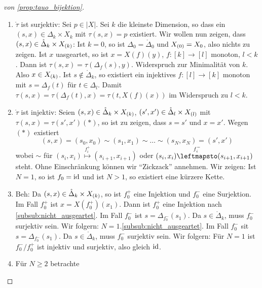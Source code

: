 \begin{proof}[von \cref{prop:tauo_bijektion}]
  \begin{enumerate}
    \item $\mathring\tau$ ist surjektiv: Sei $p\in |X|$. Sei
      $k$ die kleinste Dimension, so dass ein $(s,x) \in\Delta_k\times X_k$ mit
      $\tau(s,x) = p$ existiert. Wir wollen nun zeigen, dass
      $(s,x) \in \mathring\Delta_k \times X_{(k)}$: Ist $k=0$, so ist 
      $\Delta_0 = \mathring\Delta_0$ und $X_{(0)} = X_0$, also nichts zu
      zeigen. Ist $x$ uasgeartet, so ist $x = X(f)(y)$, $f:[k]\to[l]$ monoton,
      $l < k$. Dann ist $\tau(s,x) = \tau(\Delta_f(s),y)$. Widerspruch zur
      Minimalität von $k$. Also $x \in X_{(k)}$. Ist
      $s\notin\mathring\Delta_k$, so existiert ein injektives $f:[l]\to[k]$
      monoton mit $s = \Delta_f(t)$ für $t\in \Delta_l$. Damit 
      $\tau(s,x) = \tau(\Delta_f(t),x) = \tau(t,X(f)(x))$ im Widerspruch zu 
      $l<k$.
    \item $\mathring\tau$ ist injektiv: Seien 
      $(s,x) \in \mathring\Delta_k \times X_{(k)}$,
      $(s',x')\in\mathring\Delta_l\times X_{(l)}$ mit $\tau(s,x) =
      \tau(s',x') (\ast)$, so ist zu zeigen, dass $s = s'$ und $x = x'$.
      Wegen $(\ast)$ existiert 
      \[ (s,x) = (s_0,x_0) \sim (s_1,x_1) \sim \ldots\sim (s_N,x_N) = (s',x')\]
      wobei $\sim$ für $(s_i,x_i) \overset{f_i^+}{\mapsto} (s_{i+1},x_{i+1})$
      oder $(s_i,x_i) \overset{f_i^-}{\leftmapsto} (s_{i+1},x_{i+1})$ 
      steht. Ohne Einschränkung können wir ``Zickzack'' annehmen.
      Wir zeigen: Ist $N=1$, so ist $f_0 = \operatorname{id}$ und ist $N>1$, so existiert
      eine kürzere Kette.
    \item Beh: Da $(s,x)\in\mathring\Delta_k \times X_{(k)}$, so ist
      $f_0^+$ eine Injektion und $f_0^-$ eine Surjektion.
      Im Fall $f_0^+$ ist $x = X(f_0^+)(x_1)$. Dann ist $f_0^+$ eine Injektion
      nach \autoref{subsub:nicht_ausgeartet}. Im Fall $f_0^-$ ist
      $s = \Delta_{f_0^-}(s_1)$. Da $s \in \mathring\Delta_k$, muss $f_0^-$
      surjektiv sein. Wir folgern: $N=1$.\autoref{subsub:nicht_ausgeartet}. Im
      Fall $f_0^-$ sit
      $s = \Delta_{f_0^-}(s_1)$. Da $s \in \mathring\Delta_k$, muss $f_0^-$
      surjektiv sein. Wir folgern: Für $N=1$ ist $f_0^- / f_0^+$ ist injektiv
      und surjektiv, also gleich $\operatorname{id}$.
    \item Für $N\geq 2$ betrachte
      \begin{center}
\end{center}
\end{enumerate}
\end{proof}
